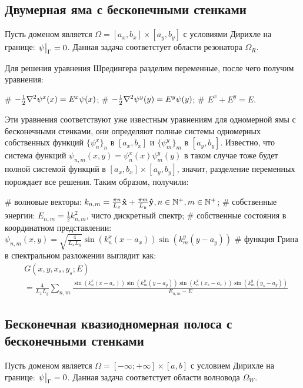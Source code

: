 \subsection{Двумерная яма с бесконечными стенками}
Пусть доменом является $\Omega = [a_x, b_x] \times [a_y, b_y]$ с условиями Дирихле на границе: $\eval{\psi}_{\Gamma} = 0$. Данная задача соответстует области резонатора $\Omega_R$.

Для решения уравнения Шредингера разделим переменные, после чего получим уравнения:
\begin{ilist}
# $-\frac{1}{2} \laplacian \psi^x(x) = E^x \psi(x)$;
# $-\frac{1}{2} \laplacian \psi^y(y) = E^y \psi(y)$;
# $E^x + E^y = E$.
\end{ilist}
Эти уравнения соответствуют уже известным уравнениям для одномерной ямы с бесконечными стенками, они определяют полные системы одномерных собственных функций $\{\psi^x_n\}_n$ в $[a_x, b_x]$ и $\{\psi^y_m\}_m$ в $[a_y, b_y]$. Известно, что система функций $\psi_{n, m}(x, y) = \psi_n^x(x) \psi_m^y(y)$ в таком случае тоже будет полной системой функций в $[a_x, b_x] \times [a_y, b_y]$, значит, разделение переменных порождает все решения. Таким образом, получили:

\begin{ilist}
# волновые векторы: $k_{n, m} = \frac{\pi n}{L_x} \vb{\hat{x}} + \frac{\pi m}{L_y} \vb{\hat{y}}, n \in \mathbb{N}^+, m \in \mathbb{N}^+$;
# собственные энергии: $E_{n, m} = \frac{1}{2} k_{n, m}^2$, чисто дискретный спектр;
# собственные состояния в координатном представлении: $\psi_{n, m}(x, y) = \sqrt{\frac{4}{L_x L_y}} \sin(k^x_n (x - a_x)) \sin(k^y_m (y - a_y))$
# функция Грина в спектральном разложении выглядит как:
\begin{align*}
& G(x, y, x_s, y_s; E) \\
& = \frac{4}{L_x L_y} \sum\limits_{n, m} \frac{\sin(k^x_n (x - a_x)) \sin(k^y_m (y - a_y)) \sin(k^x_n (x_s - a_x)) \sin(k^y_m (y_s - a_y))}{E_{n, m} - E}
\end{align*}
\end{ilist}

\subsection{Бесконечная квазиодномерная полоса с бесконечными стенками}
Пусть доменом является $\Omega = [-\infty; +\infty] \times [a, b]$ с условием Дирихле на границе: $\eval{\psi}_{\Gamma} = 0$. Данная задача соответстует области волновода $\Omega_W$.

